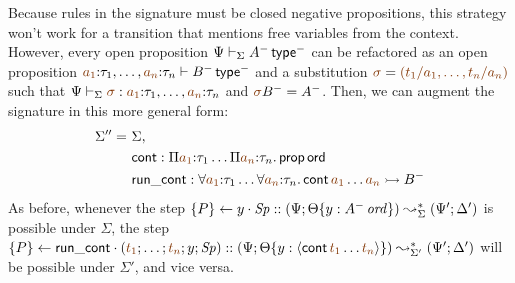 Because rules in the signature must be closed negative propositions,
this strategy won't work for a transition that mentions free variables
from the context. However, every open proposition $\Psi \vdash_\Sigma
A^-\,{\sf type}^-$ can be refactored as an open proposition 
$\lf{a_1}{:}\tau_1, \ldots, \lf{a_n}{:}\tau_n \vdash B^-\,{\sf type}^-$ and
a substitution $\lf{\sigma} = \lf{(t_1/a_1, \ldots, t_n/a_n)}$ such that
$\Psi \vdash_\Sigma \lf{\sigma} : \lf{a_1}{:}\tau_1, \ldots, \lf{a_n}{:}\tau_n$
and $\lf{\sigma}B^- = A^-$. Then, we can augment the signature in this 
more general form:
\begin{align*}
\Sigma'' = ~ & \Sigma, 
\\    ~~ & {\sf cont} :  \Pi\lf{a_1}{:}\tau_1\ldots \Pi\lf{a_n}{:}\tau_n.\,{\sf prop}\,{\sf ord}
\\    ~~ & {\sf run\_cont} : \forall\lf{a_1}{:}\tau_1\ldots \forall\lf{a_n}{:}\tau_n.\,{\sf cont}\,\lf{a_1}\ldots\lf{a_n} \lefti B^-
\end{align*}
As before, whenever the step $\{{P}\} \leftarrow {y} \cdot {{\it Sp}} :: (\Psi;
{\Theta}\{{y : {A^-}\,{{\it ord}}}\}) \leadsto^*_{\Sigma} (\Psi';
\Delta')$ is possible under $\Sigma$, the step $\tstep{P}{\sf
  run\_cont}{(\lf{t_1}; \ldots; \lf{t_n}; y; \Sp)} ::
  (\Psi; \tackon{\Theta}{y : \susp{{\sf cont}\,\lf{t_1}\ldots\lf{t_n}}}) \leadsto^*_{\Sigma'} (\Psi';
\Delta')$ will be possible under
$\Sigma'$, and vice versa.

